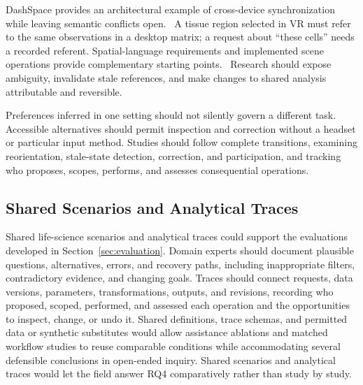 DashSpace provides an architectural example of cross-device synchronization while leaving semantic conflicts open.~\cite{AgendaBorowski2025} A tissue region selected in VR must refer to the same observations in a desktop matrix; a request about ``these cells'' needs a recorded referent. Spatial-language requirements and implemented scene operations provide complementary starting points.~\cite{SongEmbodiedNLI,VOICE} Research should expose ambiguity, invalidate stale references, and make changes to shared analysis attributable and reversible.

Preferences inferred in one setting should not silently govern a different task. Accessible alternatives should permit inspection and correction without a headset or particular input method. Studies should follow complete transitions, examining reorientation, stale-state detection, correction, and participation, and tracking who proposes, scopes, performs, and assesses consequential operations.

\subsection{Shared Scenarios and Analytical Traces}
\label{sec:challenges-evaluation}
Shared life-science scenarios and analytical traces could support the evaluations developed in Section~\ref{sec:evaluation}. Domain experts should document plausible questions, alternatives, errors, and recovery paths, including inappropriate filters, contradictory evidence, and changing goals. Traces should connect requests, data versions, parameters, transformations, outputs, and revisions, recording who proposed, scoped, performed, and assessed each operation and the opportunities to inspect, change, or undo it. Shared definitions, trace schemas, and permitted data or synthetic substitutes would allow assistance ablations and matched workflow studies to reuse comparable conditions while accommodating several defensible conclusions in open-ended inquiry. Shared scenarios and analytical traces would let the field answer RQ4 comparatively rather than study by study.

